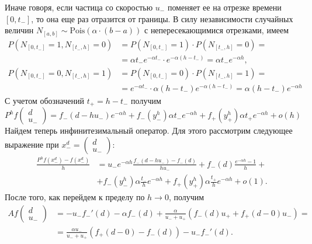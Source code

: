 \documentclass[12pt,a4paper]{article}
\begin{document}
 Иначе говоря, если частица со скоростью $u_-$ поменяет ее на отрезке времени $[0, t_-]$, то она еще раз отразится от границы.
В силу независимости случайных величин $N_{[a, b]} \sim \text{Pois} (\alpha \cdot (b - a))$ с непересекающимися отрезками, имеем
\begin{equation*}
    \begin{aligned}
  P (N_{[0, t_-]} = 1, N_{[t_-, h]} = 0) &= P (N_{[0, t_-]} = 1) \cdot P (N_{[t_-, h]} = 0) = \\
 &= \alpha t_- e^{-\alpha t_-} \cdot e^{-\alpha (h - t_-)} = \alpha t_- e^{- \alpha h},\\
 P (N_{[0, t_-]} = 0, N_{[t_-, h]} = 1) &= P (N_{[0, t_-]} = 0) \cdot P (N_{[t_-, h]} = 1) = \\
&= e^{- \alpha t_-} \cdot \alpha (h - t_-) e^{- \alpha (h - t_-)} = \alpha (h - t_-) e^{- \alpha h}
    \end{aligned}
\end{equation*}
С учетом обозначений $t_+ = h - t_-$ получим
$$P^h f \begin{pmatrix}
 d \\
 u_-
\end{pmatrix} = f_- (d - h u_-) e^{- \alpha h} + f_- (y^h_-) \alpha t_- e^{- \alpha h} + f_+ (y^h_+ ) \alpha t_+ e^{- \alpha h} + o(h)$$
Найдем теперь инфинитезимальный оператор. Для этого рассмотрим следующее выражение при $x^d_- = 
\begin{pmatrix}
 d \\
 u_-
\end{pmatrix}
$:
\begin{equation*}
    \begin{aligned}
  \frac{P^h f (x^d_-) - f (x^d_-)}{h} &= u_- e^{- \alpha h} \frac{f_- (d - h u_-) - f_- (d)}{h u_-} + f_- (d) \frac{e^{- \alpha h} - 1}{h} + \\
&+ f_- (y^h_-) \alpha \frac{t_-}{h} e^{- \alpha h} + f_+ (y^h_+ ) \alpha \frac{t_+}{h} e^{- \alpha h} + o(1). 
    \end{aligned}
\end{equation*}
После того, как перейдем к пределу по $h \to 0$, получим
\begin{equation*}
    \begin{aligned}
  A f \begin{pmatrix}
 d \\
 u_-
\end{pmatrix} &= - u_- f_-' (d) - \alpha f_- (d) + \frac{\alpha}{u_- + u_+} \left(f_- (d) u_+ + f_+ (d - 0) u_- \right) =\\
&= \frac{\alpha u_-}{u_- + u_+} (f_+ (d - 0) - f_- (d)) - u_- f_-' (d).      
    \end{aligned}
\end{equation*}
\end{document}

